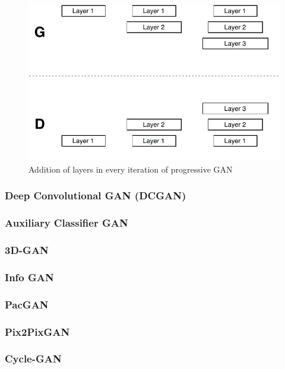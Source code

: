 \documentclass[conference]{IEEEtran}
\begin{document}
\begin{figure}[!h]
    \centerline{\includegraphics[scale=0.7]{figures/PGAN.pdf}}
    \caption{Addition of layers in every iteration of progressive GAN}
    \label{fig3}
\end{figure}

\subsubsection{Deep Convolutional GAN (DCGAN)}

\subsubsection{Auxiliary Classifier GAN}

\subsubsection{3D-GAN}

\subsubsection{Info GAN}

\subsubsection{PacGAN}

\subsubsection{Pix2PixGAN}

\subsubsection{Cycle-GAN}
\end{document}
